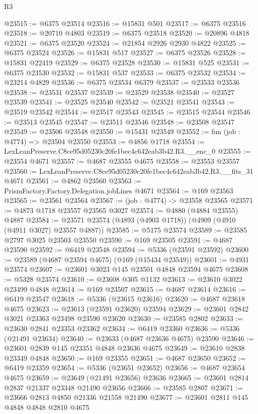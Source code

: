 \begin{lexlean}{R3}
\begin{coremodule}
@23515 := @6375 @23514
@23516 := @15831 @501
@23517 := @6375 @23516
@23518 := @20710 @4803
@23519 := @6375 @23518
@23520 := @20896 @4818
@23521 := @6375 @23520
@23524 := @21854 @2926 @2930 @4822
@23525 := @6375 @23524
@23526 := @15831 @517
@23527 := @6375 @23526
@23528 := @15831 @22419
@23529 := @6375 @23528
@23530 := @15831 @525
@23531 := @6375 @23530
@23532 := @15831 @537
@23533 := @6375 @23532
@23534 := @23214 @4829
@23536 := @6375 @23534 @6379
@23537 := @23533 @23536
@23538 := @23531 @23537
@23539 := @23529 @23538
@23540 := @23527 @23539
@23541 := @23525 @23540
@23542 := @23521 @23541
@23543 := @23519 @23542
@23544 := @23517 @23543
@23545 := @23515 @23544
@23546 := @23513 @23545
@23547 := @23511 @23546
@23548 := @23508 @23547
@23549 := @23506 @23548
@23550 := @15431 @23549
@23552 := fun (job : @4774) => @23504 @23550
@23553 := @4856 @1718
@23554 := LexLeanPreserve.C8ce95d05230c20fe1bec4c642eab3b42.R3.__enc_0
@23555 := @23554 @4671
@23557 := @4687 @23555 @4675
@23558 := @23553 @23557
@23560 := LexLeanPreserve.C8ce95d05230c20fe1bec4c642eab3b42.R3.__fits_31 @4671
@23561 := @4862 @23560
@23563 := PrismFactory.Factory.Delegation.jobLines @4671
@23564 := @169 @23563
@23565 := @23561 @23564
@23567 := (job : @4774) -> @23558 @23565
@23571 := @4873 @1718 @23557 @23565 @3027
@23574 := @4880 (@4884 @23555) @4887
@23584 := @23571 @23574 (@4893 (@4903 @1718)) (@4909 (@4910 (@4911 @3027) @23557 @4887))
@23585 := @5175 @23574
@23589 := @23585 @2797 @3025 @23503 @23550
@23590 := @169 @23505
@23591 := @4687 @23590
@23592 := @6419 @23548
@23594 := @5336 (@23591 @23592)
@23600 := @23589 (@4687 @23594 @4675) (@169 (@15434 @23549))
@23601 := @4931 @23574
@23607 := @23601 @3023 @145 @23501 @4848 @23594 @4675
@23608 := @5328 @23574
@23610 := @23608 @305 @1132
@23613 := @23610 @3022 @23499 @4848
@23614 := @169 @23507
@23615 := @4687 @23614
@23616 := @6419 @23547
@23618 := @5336 (@23615 @23616)
@23620 := @4687 @23618 @4675
@23623 := @23613 (@23591 @23620) @23594
@23629 := @23601 @2842 @3021 @23363 @23498 @23590 @23620
@23630 := @23585 @2802
@23633 := @23630 @2841 @23353 @23362
@23634 := @6419 @23360
@23636 := @5336 (@21491 @23634)
@23640 := @23633 (@4687 @23636 @4675) @23590
@23646 := @23601 @2839 @145 @23351 @4848 @23636 @4675
@23649 := @23610 @2838 @23349 @4848
@23650 := @169 @23355
@23651 := @4687 @23650
@23652 := @6419 @23359
@23654 := @5336 (@23651 @23652)
@23656 := @4687 @23654 @4675
@23659 := @23649 (@21491 @23656) @23636
@23665 := @23601 @2814 @2837 @21337 @23348 @21490 @23656
@23666 := @23585 @2807
@23671 := @23666 @2813 @4850 @21336 @21558 @21490
@23677 := @23601 @2811 @145 @4848 @4848 @2810 @4675

\end{coremodule}
\end{lexlean}
